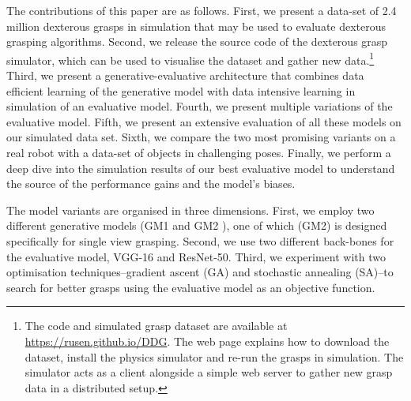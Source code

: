 The contributions of this paper are as follows. First, we present a data-set of 2.4 million dexterous grasps in simulation that may be used to evaluate dexterous grasping algorithms. Second, we release the source code of the dexterous grasp simulator, which can be used to visualise the dataset and gather new data.\footnote{The code and simulated grasp dataset are available at \href{https://rusen.github.io/DDG}{https://rusen.github.io/DDG}. The web page explains how to download the dataset, install the physics simulator and re-run the grasps in simulation. The simulator acts as a client alongside a simple web server to gather new grasp data in a distributed setup.} Third, we present a generative-evaluative architecture that combines data efficient learning of the generative model with data intensive learning in simulation of an evaluative model. Fourth, we present multiple variations of the evaluative model. Fifth, we present an extensive evaluation of all these models on our simulated data set. Sixth, we compare the two most promising variants on a real robot with a data-set of objects in challenging poses. Finally, we perform a deep dive into the simulation results of our best evaluative model to understand the source of the performance gains and the model's biases.

The model variants are organised in three dimensions. First, we employ two different generative models (GM1 \cite{kopicki2015ijrr} and GM2 \cite{kopicki2019ijrr}), one of which (GM2) is designed specifically for single view grasping. Second, we use two different back-bones for the evaluative model, VGG-16 and ResNet-50. Third, we experiment with two optimisation techniques--gradient ascent (GA) and stochastic annealing (SA)--to search for better grasps using the evaluative model as an objective function.


